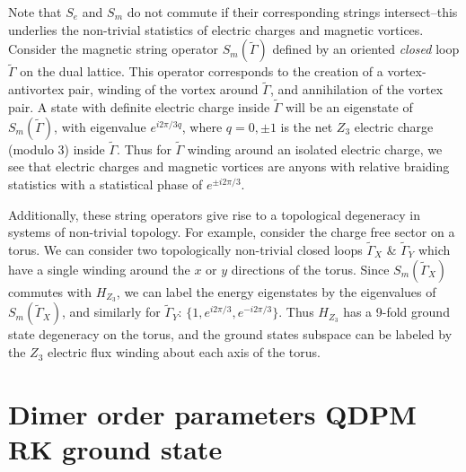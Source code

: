 \documentclass[twocolumn,prb,aps,floatfix,superscriptaddress]{revtex4-1}
\begin{document}
Note that  $S_e$ and $S_m$ do not commute if their corresponding strings intersect--this underlies the non-trivial statistics of electric charges and magnetic vortices. Consider the magnetic string operator $S_m(\tilde{\Gamma})$ defined by an oriented \emph{closed} loop $\tilde{\Gamma}$ on the dual lattice. This operator corresponds to the creation of a vortex-antivortex pair, winding of the vortex around $\tilde{\Gamma}$, and annihilation of the vortex pair. A state with definite electric charge inside $\tilde{\Gamma}$ will be an eigenstate of $S_m(\tilde{\Gamma})$, with eigenvalue $e^{ i 2 \pi/3 q}$, where $q=0,\pm1$ is the net $Z_3$ electric charge (modulo 3) inside $\tilde{\Gamma}$.  Thus for $\tilde{\Gamma}$ winding around an isolated electric charge, we see that electric charges and magnetic vortices are anyons with relative braiding statistics with a statistical phase of $e^{\pm i 2\pi/3}$.

Additionally, these string operators give rise to a topological degeneracy in systems of non-trivial topology. For example, consider the charge free sector on a torus. We can consider two topologically non-trivial closed loops $\tilde{\Gamma}_{X}$ \& $\tilde{\Gamma}_{Y}$ which have a single winding around the $x$ or $y$ directions of the torus. Since $S_m(\tilde{\Gamma}_{X})$ commutes with $H_{Z_3}$, we can label the energy eigenstates by the eigenvalues of $S_m(\tilde{\Gamma}_{X})$, and similarly for $\tilde{\Gamma}_Y$: $\{1,e^{ i 2\pi/3},e^{- i 2\pi/3}\}$. Thus $H_{Z_3}$ has a 9-fold ground state degeneracy on the torus, and the ground states subspace can be labeled by the $Z_3$ electric flux winding about each axis of the torus.
            
\section{Dimer order parameters QDPM RK ground state}
\label{sec:dimer_order_parameters}
%
\end{document}
